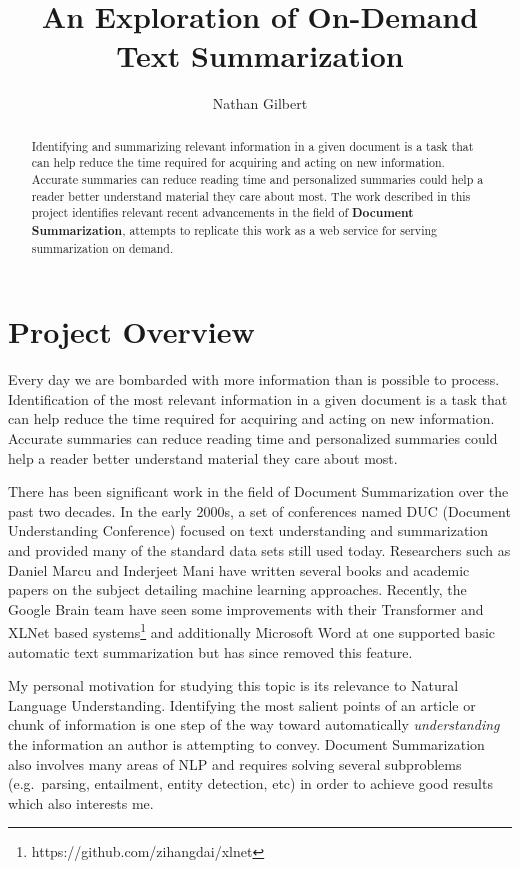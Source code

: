 \documentclass{article}
\begin{document}
\title{An Exploration of On-Demand Text Summarization}
\author{Nathan Gilbert}

\maketitle

\begin{abstract}
    Identifying and summarizing relevant information in a given document is a task that can help reduce the time required for acquiring and acting on new information.
    Accurate summaries can reduce reading time and personalized summaries could help a reader better understand material they care about most.
    The work described in this project identifies relevant recent advancements in the field of \textbf{Document Summarization}, attempts to replicate this work as a web service for serving summarization on demand.
\end{abstract}

\section{Project Overview}
Every day we are bombarded with more information than is possible to process.
Identification of the most relevant information in a given document is a task
that can help reduce the time required for acquiring and acting on new
information. Accurate summaries can reduce reading time and personalized
summaries could help a reader better understand material they care about most.

There has been significant work in the field of Document Summarization over the
past two decades. In the early 2000s, a set of conferences named DUC (Document
Understanding Conference) focused on text understanding and summarization and
provided many of the standard data sets still used today. Researchers such as
Daniel Marcu and Inderjeet Mani have written several books and academic papers
on the subject detailing machine learning approaches. Recently, the Google
Brain team have seen some improvements with their Transformer and XLNet based
systems\footnote{https://github.com/zihangdai/xlnet} and additionally Microsoft
Word at one supported basic automatic text summarization but has since removed
this feature.

My personal motivation for studying this topic is its relevance to Natural
Language Understanding. Identifying the most salient points of an article or
chunk of information is one step of the way toward automatically
\textit{understanding} the information an author is attempting to convey.
Document Summarization also involves many areas of NLP and requires solving several
subproblems (e.g.\ parsing, entailment, entity detection, etc) in order to
achieve good results which also interests me.
\end{document}
